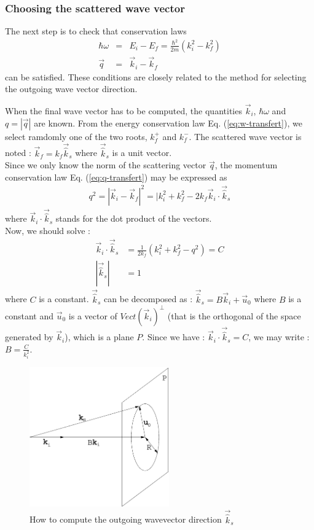 \subsubsection{Choosing the scattered wave vector}

The next step is to check that conservation laws
\begin{eqnarray}
\hbar \omega &=& E_i - E_f = \frac{\hbar^2}{2m}(k_i^2 - k_f^2) \label{eq:q-transfert} \\
\vec q &=& \vec k_i - \vec k_f \label{eq:w-transfert}
\end{eqnarray}
can be satisfied. These conditions are closely related to the method for selecting the outgoing wave vector direction.

When the final wave vector has to be computed, the quantities $\vec{k}_i$, $\hbar \omega$ and $q = |\vec{q}|$ are known.
From the energy conservation law Eq. (\ref{eq:w-transfert}), we select ramdomly one of the two roots, $k_f^+$ and $k_f^-$.
The scattered wave vector is noted : $\vec{k}_f = k_f \vec{\hat k}_s$ where $\vec{\hat k}_s$ is a unit vector.\\
Since we only know the norm of the scattering vector $\vec{q}$, the momentum conservation law Eq. (\ref{eq:q-transfert}) may be expressed as
\begin{align}
q^2 = |\vec{k}_i -\vec{k}_f|^2 = |k_i^2 + k_f^2 - 2 k_f \vec{k}_i \cdot \vec{\hat k}_s
\end{align}
where $\vec{k}_i \cdot \vec{\hat k}_s$ stands for the dot product of the vectors.\\
Now, we should solve :
\begin{align}
\vec{k}_i \cdot \vec{\hat k}_s &= \frac{1}{2k_f} (k_i^2 + k_f^2 - q^2) = C \\
|\vec{\hat k}_s| &= 1
\end{align}
where $C$ is a constant.
$\vec{\hat k}_s$ can be decomposed as : $\vec{\hat k}_s = B \vec{k}_i + \vec{u}_0$ where $B$ is a constant and $\vec{u}_0$ is a vector of $Vect(\vec{k}_i)^{\bot}$ (that is the orthogonal of the space generated by $\vec{k}_i$), which is a plane $P$.
Since we have : $\vec{k}_i \cdot \vec{\hat k}_s = C$, we may write : $B = \frac{C}{k_i^2}$.
\begin{figure}[!h]
\begin{center}
\includegraphics*[height=6cm]{figures/calckf_2.eps}
\caption{How to compute the outgoing wavevector direction $\vec{\hat k}_s$}
\label{fig:ann_kf}
\end{center}
\end{figure}
